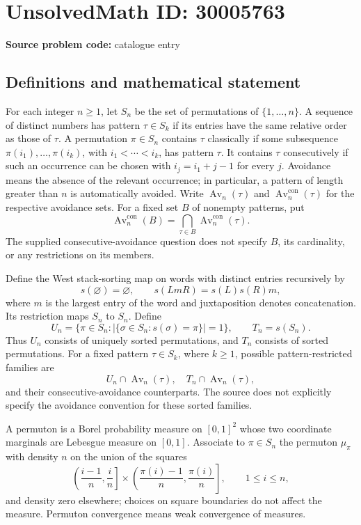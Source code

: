 \documentclass[11pt]{article}
\begin{document}
\section*{UnsolvedMath ID: 30005763}
\textbf{Source problem code:} catalogue entry
\subsection{Definitions and mathematical statement}
For each integer \(n\geq 1\), let \(S_n\) be the set of permutations of \(\{1,\ldots,n\}\). A sequence of distinct numbers has pattern \(\tau\in S_k\) if its entries have the same relative order as those of \(\tau\). A permutation \(\pi\in S_n\) contains \(\tau\) classically if some subsequence \(\pi(i_1),\ldots,\pi(i_k)\), with \(i_1<\cdots<i_k\), has pattern \(\tau\). It contains \(\tau\) consecutively if such an occurrence can be chosen with \(i_j=i_1+j-1\) for every \(j\). Avoidance means the absence of the relevant occurrence; in particular, a pattern of length greater than \(n\) is automatically avoided. Write \(\operatorname{Av}_n(\tau)\) and \(\operatorname{Av}^{\mathrm{con}}_n(\tau)\) for the respective avoidance sets. For a fixed set \(B\) of nonempty patterns, put
\[
\operatorname{Av}^{\mathrm{con}}_n(B)=\bigcap_{\tau\in B}\operatorname{Av}^{\mathrm{con}}_n(\tau).
\]
The supplied consecutive-avoidance question does not specify \(B\), its cardinality, or any restrictions on its members.

Define the West stack-sorting map on words with distinct entries recursively by
\[
s(\varnothing)=\varnothing,\qquad s(LmR)=s(L)s(R)m,
\]
where \(m\) is the largest entry of the word and juxtaposition denotes concatenation. Its restriction maps \(S_n\) to \(S_n\). Define
\[
U_n=\{\pi\in S_n:|\{\sigma\in S_n:s(\sigma)=\pi\}|=1\},
\qquad
T_n=s(S_n).
\]
Thus \(U_n\) consists of uniquely sorted permutations, and \(T_n\) consists of sorted permutations. For a fixed pattern \(\tau\in S_k\), where \(k\geq1\), possible pattern-restricted families are
\[
U_n\cap\operatorname{Av}_n(\tau),\quad
T_n\cap\operatorname{Av}_n(\tau),
\]
and their consecutive-avoidance counterparts. The source does not explicitly specify the avoidance convention for these sorted families.

A permuton is a Borel probability measure on \([0,1]^2\) whose two coordinate marginals are Lebesgue measure on \([0,1]\). Associate to \(\pi\in S_n\) the permuton \(\mu_\pi\) with density \(n\) on the union of the squares
\[
\left(\frac{i-1}{n},\frac{i}{n}\right]\times
\left(\frac{\pi(i)-1}{n},\frac{\pi(i)}{n}\right],
\qquad 1\leq i\leq n,
\]
and density zero elsewhere; choices on square boundaries do not affect the measure. Permuton convergence means weak convergence of measures.
\end{document}
